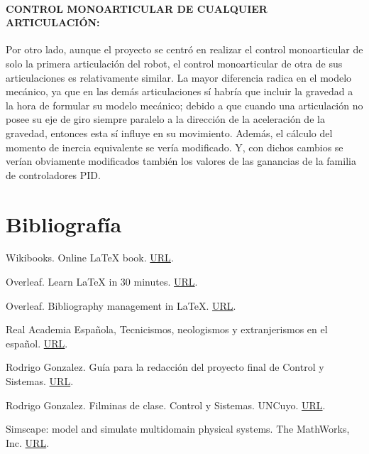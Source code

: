 \documentclass{article}
\begin{document}
\begin{sloppypar}
\paragraph{CONTROL MONOARTICULAR DE CUALQUIER ARTICULACIÓN:}
\label{sec:CONTROL MONOARTICULAR DE CUALQUIER ARTICULACIÓN:}
\hfill

Por otro lado, aunque el proyecto se centró en realizar el control monoarticular de solo la primera articulación del robot, el control monoarticular de otra de sus articulaciones es relativamente similar. La mayor diferencia radica en el modelo mecánico, ya que en las demás articulaciones sí habría que incluir la gravedad a la hora de formular su modelo mecánico; debido a que cuando una articulación no posee su eje de giro siempre paralelo a la dirección de la aceleración de la gravedad, entonces esta sí influye en su movimiento. Además, el cálculo del momento de inercia equivalente se vería modificado. Y, con dichos cambios se verían obviamente modificados también los valores de las ganancias de la familia de controladores PID.








\section*{Bibliografía}

Wikibooks. Online \LaTeX{} book.
\href{https://en.wikibooks.org/wiki/LaTeX/}{URL}.

Overleaf. Learn LaTeX in 30 minutes.
\href{https://www.overleaf.com/learn/latex/Learn_LaTeX_in_30_minutes}{URL}.

Overleaf. Bibliography management in LaTeX.
\href{https://www.overleaf.com/learn/latex/Bibliography_management_in_LaTeX}{URL}.

Real Academia Española, Tecnicismos, neologismos y extranjerismos en el español.
\href{http://revistas.rae.es/bilrae/article/view/218/525}{URL}.

Rodrigo Gonzalez. Guía para la redacción del proyecto final de Control y Sistemas.
\href{https://es.overleaf.com/project/5ce7209e973f0d6ead24dcef}{URL}.

Rodrigo Gonzalez. Filminas de clase. Control y Sistemas. UNCuyo.
\href{https://github.com/rodralez/control}{URL}.

Simscape: model and simulate multidomain physical systems. The MathWorks, Inc.
\href{https://la.mathworks.com/products/simscape.html}{URL}.


\end{sloppypar}
\end{document}

